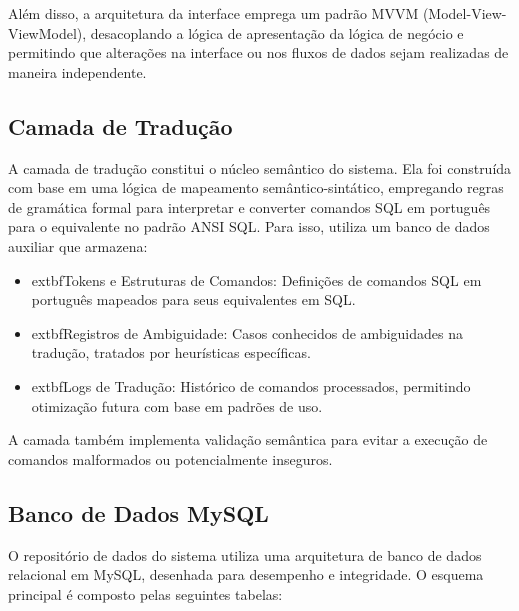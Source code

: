 
Além disso, a arquitetura da interface emprega um padrão MVVM (Model-View-ViewModel), desacoplando a lógica de apresentação da lógica de negócio e permitindo que alterações na interface ou nos fluxos de dados sejam realizadas de maneira independente.

\subsection{Camada de Tradução}
A camada de tradução constitui o núcleo semântico do sistema. Ela foi construída com base em uma lógica de mapeamento semântico-sintático, empregando regras de gramática formal para interpretar e converter comandos SQL em português para o equivalente no padrão ANSI SQL. Para isso, utiliza um banco de dados auxiliar que armazena:

\begin{itemize}
    \item 	extbf{Tokens e Estruturas de Comandos}: Definições de comandos SQL em português mapeados para seus equivalentes em SQL.
    \item 	extbf{Registros de Ambiguidade}: Casos conhecidos de ambiguidades na tradução, tratados por heurísticas específicas.
    \item 	extbf{Logs de Tradução}: Histórico de comandos processados, permitindo otimização futura com base em padrões de uso.
\end{itemize}


A camada também implementa validação semântica para evitar a execução de comandos malformados ou potencialmente inseguros.

\subsection{Banco de Dados MySQL}
O repositório de dados do sistema utiliza uma arquitetura de banco de dados relacional em MySQL, desenhada para desempenho e integridade. O esquema principal é composto pelas seguintes tabelas:

